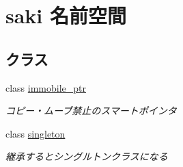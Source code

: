 \hypertarget{namespacesaki}{}\section{saki 名前空間}
\label{namespacesaki}
\subsection*{クラス}
\begin{DoxyCompactItemize}
\item 
class \mbox{\hyperlink{classsaki_1_1immobile__ptr}{immobile\+\_\+ptr}}
\begin{DoxyCompactList}\small\item\em コピー・ムーブ禁止のスマートポインタ \end{DoxyCompactList}\item 
class \mbox{\hyperlink{classsaki_1_1singleton}{singleton}}
\begin{DoxyCompactList}\small\item\em 継承するとシングルトンクラスになる \end{DoxyCompactList}\end{DoxyCompactItemize}
